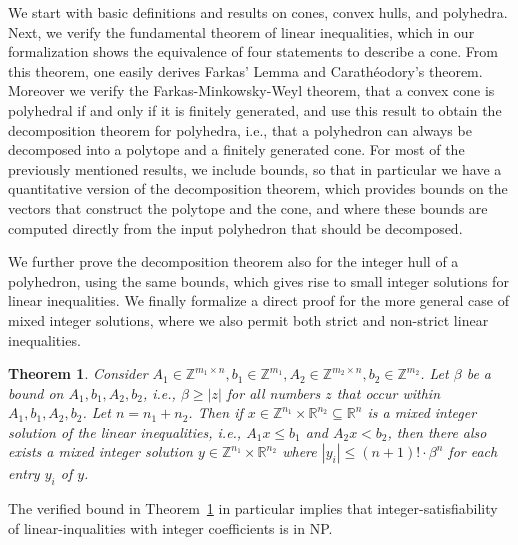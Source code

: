 \documentclass[11pt,a4paper]{article}
\newcommand\ints{\mathbb{Z}}
\newcommand\reals{\mathbb{R}}
\newtheorem{theorem}{Theorem}
\begin{document}
We start with basic definitions and results on cones, convex hulls, and polyhedra.
Next, we verify the fundamental theorem of linear inequalities, which in
our formalization shows the equivalence of four statements to describe a cone. 
From this theorem, one easily derives Farkas' Lemma and Carath\'eodory's theorem.
Moreover we verify the Farkas-Minkowsky-Weyl theorem, that a convex cone is polyhedral if and only if
it is finitely generated, and use this result to obtain 
the decomposition theorem for polyhedra, i.e., that a polyhedron can always be decomposed into
a polytope and a finitely generated cone. 
For most of the previously mentioned results, we include bounds, so that in particular we have a
quantitative version of the decomposition theorem, which provides bounds on the vectors that construct
the polytope and the cone, and where these bounds are 
computed directly from the input polyhedron that should be decomposed.

We further prove the decomposition theorem also for the integer hull of a polyhedron, using the same bounds,
which gives rise to small integer solutions for linear inequalities. We finally formalize a direct proof
for the more general case of mixed integer solutions, where we also permit both strict and non-strict 
linear inequalities. 

\begin{theorem}
\label{thm}
Consider  
$A_1 \in \ints^{m_1 \times n}, b_1 \in \ints^{m_1}, A_2 \in \ints^{m_2 \times n}, b_2 \in \ints^{m_2}$.
Let $\beta$ be a bound on $A_1,b_1,A_2,b_2$, i.e., $\beta \geq |z|$ for all numbers $z$ that occur within $A_1,b_1,A_2,b_2$. Let $n = n_1+n_2$.
Then if $x \in \ints^{n_1} \times \reals^{n_2} \subseteq \reals^n$ is a mixed integer solution of the linear inequalities, i.e., 
$A_1x \leq b_1$ and $A_2x < b_2$, then there also exists a mixed integer solution 
$y \in \ints^{n_1} \times \reals^{n_2}$ where 
$|y_i| \leq (n+1)! \cdot \beta^n$ for each entry $y_i$ of $y$.
\end{theorem}

The verified bound in Theorem~\ref{thm} in particular implies that integer-satisfiability
of linear-inqualities with integer coefficients is in NP.







\end{document}
